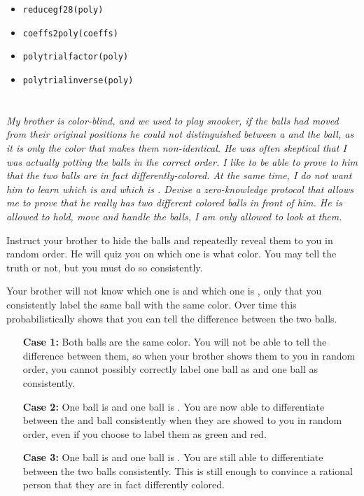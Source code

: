 \documentclass[12pt]{article}
\begin{document}
    \begin{itemize}
        \item \texttt{reduce\textunderscore{}gf28(poly)}
        \item \texttt{coeffs2poly(coeffs)}
        \item \texttt{poly\textunderscore{}trial\textunderscore{}factor(poly)}
        \item \texttt{poly\textunderscore{}trial\textunderscore{}inverse(poly)}
    \end{itemize}

\newpage

\section{} \textit{My brother is color-blind, and we used to play snooker, if the balls had moved from their original positions he could not distinguished between a \red{} and the \green{} ball, as it is only the color that makes them non-identical. He was often skeptical that I was actually potting the balls in the correct order. I like to be able to prove to him that the two balls are in fact differently-colored. At the same time, I do not want him to learn which is \red{} and which is \green{}. Devise a zero-knowledge protocol that allows me to prove that he really has two different colored balls in front of him. He is allowed to hold, move and handle the balls, I am only allowed to look at them.}

    Instruct your brother to hide the balls and repeatedly reveal them to you in random order. He will quiz you on which one is what color. You may tell the truth or not, but you must do so consistently.

    Your brother will not know which one is \green{} and which one is \red{}, only that you consistently label the same ball with the same color. Over time this probabilistically shows that you can tell the difference between the two balls.

    \begin{enumerate}
        \item[\textbf{Case 1:}] Both balls are the same color. You will not be able to tell the difference between them, so when your brother shows them to you in random order, you cannot possibly correctly label one ball as \red{} and one ball as \green{} consistently.

        \item[\textbf{Case 2:}] One ball is \red{} and one ball is \green{}. You are now able to differentiate between the \red{} and \green{} ball consistently when they are showed to you in random order, even if you choose to label them as {\color{red}green} and {\color{green}red}.

        \item[\textbf{Case 3:}] One ball is \purple{} and one ball is \orange{}. You are still able to differentiate between the two balls consistently. This is still enough to convince a rational person that they are in fact differently colored.
    \end{enumerate}
\end{document}
